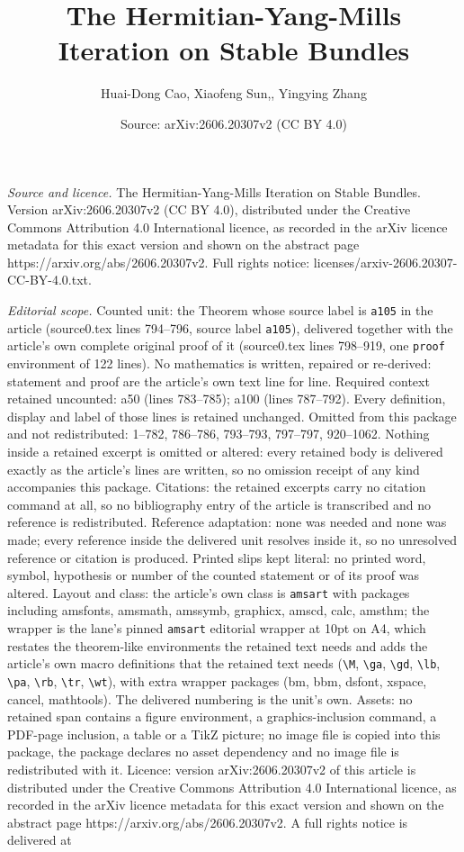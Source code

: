 \documentclass[10pt,a4paper]{amsart}
\title[The Hermitian-Yang-Mills Iteration on Stable Bundles]{The Hermitian-Yang-Mills Iteration on Stable Bundles}
\author{Huai-Dong Cao, Xiaofeng Sun,, Yingying Zhang}
\date{Source: arXiv:2606.20307v2 (CC BY 4.0)}
\begin{document}
\maketitle

\noindent\emph{Source and licence.} The Hermitian-Yang-Mills Iteration on Stable Bundles. Version arXiv:2606.20307v2 (CC BY 4.0), distributed under the Creative Commons Attribution 4.0 International licence, as recorded in the arXiv licence metadata for this exact version and shown on the abstract page https://arxiv.org/abs/2606.20307v2. Full rights notice: licenses/arxiv-2606.20307-CC-BY-4.0.txt.\par\smallskip

\noindent\textit{Editorial scope.} Counted unit: the Theorem whose source label is \texttt{a105} in the article (source0.tex lines 794--796, source label \texttt{a105}), delivered together with the article's own complete original proof of it (source0.tex lines 798--919, one \texttt{proof} environment of 122 lines). No mathematics is written, repaired or re-derived: statement and proof are the article's own text line for line. Required context retained uncounted: a50 (lines 783--785); a100 (lines 787--792). Every definition, display and label of those lines is retained unchanged. Omitted from this package and not redistributed: 1--782, 786--786, 793--793, 797--797, 920--1062. Nothing inside a retained excerpt is omitted or altered: every retained body is delivered exactly as the article's lines are written, so no omission receipt of any kind accompanies this package. Citations: the retained excerpts carry no citation command at all, so no bibliography entry of the article is transcribed and no reference is redistributed. Reference adaptation: none was needed and none was made; every reference inside the delivered unit resolves inside it, so no unresolved reference or citation is produced. Printed slips kept literal: no printed word, symbol, hypothesis or number of the counted statement or of its proof was altered. Layout and class: the article's own class is \texttt{amsart} with packages including amsfonts, amsmath, amssymb, graphicx, amscd, calc, amsthm; the wrapper is the lane's pinned \texttt{amsart} editorial wrapper at 10pt on A4, which restates the theorem-like environments the retained text needs and adds the article's own macro definitions that the retained text needs (\texttt{\textbackslash M}, \texttt{\textbackslash ga}, \texttt{\textbackslash gd}, \texttt{\textbackslash lb}, \texttt{\textbackslash pa}, \texttt{\textbackslash rb}, \texttt{\textbackslash tr}, \texttt{\textbackslash wt}), with extra wrapper packages (bm, bbm, dsfont, xspace, cancel, mathtools). The delivered numbering is the unit's own. Assets: no retained span contains a figure environment, a graphics-inclusion command, a PDF-page inclusion, a table or a TikZ picture; no image file is copied into this package, the package declares no asset dependency and no image file is redistributed with it. Licence: version arXiv:2606.20307v2 of this article is distributed under the Creative Commons Attribution 4.0 International licence, as recorded in the arXiv licence metadata for this exact version and shown on the abstract page https://arxiv.org/abs/2606.20307v2. A full rights notice is delivered at 
\end{document}
